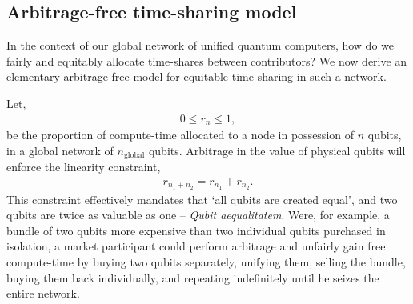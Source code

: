 %
%

\subsection{Arbitrage-free time-sharing model}\label{sec:arb_free_time_share} 

In the context of our global network of unified quantum computers, how do we fairly and equitably allocate time-shares between contributors? We now derive an elementary arbitrage-free model for equitable time-sharing in such a network.

Let,
\begin{align}
	0\leq r_n \leq 1,
\end{align}
be the proportion of compute-time allocated to a node in possession of $n$ qubits, in a global network of $n_\text{global}$ qubits. Arbitrage in the value of physical qubits will enforce the linearity constraint,
\begin{align}
	r_{n_1+n_2} = r_{n_1} + r_{n_2}.
\end{align}
This constraint effectively mandates that `all qubits are created equal', and two qubits are twice as valuable as one -- \textit{Qubit aequalitatem}. Were, for example, a bundle of two qubits more expensive than two individual qubits purchased in isolation, a market participant could perform arbitrage and unfairly gain free compute-time by buying two qubits separately, unifying them, selling the bundle, buying them back individually, and repeating indefinitely until he seizes the entire network.

